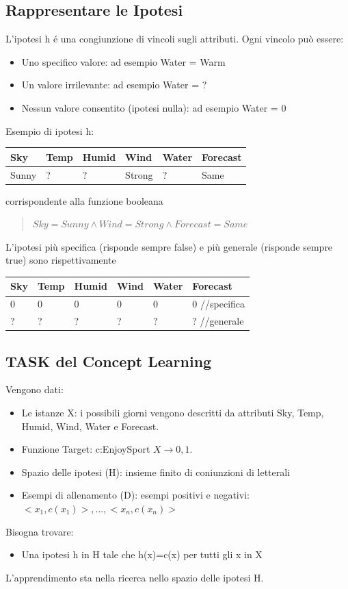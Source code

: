 \documentclass{article}
\begin{document}
\subsection{Rappresentare le Ipotesi}
L'ipotesi h é una congiunzione di vincoli sugli attributi. Ogni vincolo può essere:
\begin{itemize}
    \item Uno specifico valore: ad esempio Water = Warm
    \item Un valore irrilevante: ad esempio Water = ?
    \item Nessun valore consentito (ipotesi nulla): ad esempio Water = 0
\end{itemize}
Esempio di ipotesi h:
\begin{table}[H]
\centering
\begin{tabular}{l|l|l|l|l|l}
Sky & Temp & Humid & Wind & Water & Forecast \\ \hline
Sunny & ? & ? & Strong & ? & Same
\end{tabular}
\end{table}
corrispondente alla funzione booleana
\begin{quote}
    $Sky=Sunny \land Wind=Strong \land Forecast=Same$
\end{quote}
L'ipotesi più specifica (risponde sempre false) e più generale (risponde sempre true) sono rispettivamente
\begin{table}[H]
\centering
\begin{tabular}{l|l|l|l|l|l}
Sky & Temp & Humid & Wind & Water & Forecast \\ \hline
0 & 0 & 0 & 0 & 0 & 0 \quad //specifica \\
? & ? & ? & ? & ? & ? \quad //generale
\end{tabular}
\end{table}

\subsection{TASK del Concept Learning}
Vengono dati:
\begin{itemize}
    \item Le istanze X: i possibili giorni vengono descritti da attributi Sky, Temp, Humid, Wind, Water e Forecast.
    \item Funzione Target: c:EnjoySport $X \rightarrow{0,1}$.
    \item Spazio delle ipotesi (H): insieme finito di coniunzioni di letterali
    \item Esempi di allenamento (D): esempi positivi e negativi: $<x_1, c(x_1)>, ..., <x_n, c(x_n)>$
\end{itemize}
Bisogna trovare:
\begin{itemize}
    \item Una ipotesi h in H tale che h(x)=c(x) per tutti gli x in X
\end{itemize}
L'apprendimento sta nella ricerca nello spazio delle ipotesi H.
\end{document}
